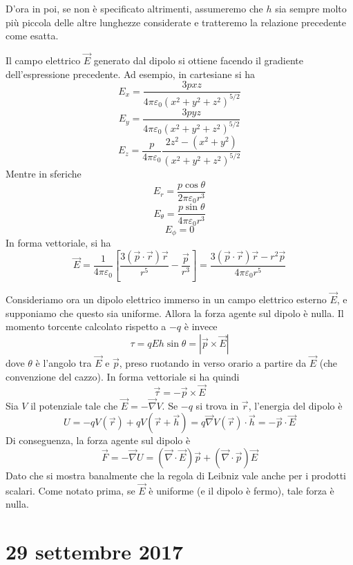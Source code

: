 \documentclass[a4paper,11pt]{book}
\let\oldnabla\nabla
\renewcommand{\nabla}{\vec{\oldnabla}}
\let\oldepsilon\epsilon
\let\oldvarepsilon\varepsilon
\renewcommand{\epsilon}{\oldvarepsilon}
\renewcommand{\varepsilon}{\oldepsilon}
\theoremstyle{definition}
\theoremstyle{theorem}
\begin{document}
	D'ora in poi, se non è specificato altrimenti, assumeremo che $h$ sia sempre molto più piccola delle altre lunghezze considerate e tratteremo la relazione precedente come  esatta.
	
	Il campo elettrico $\vec{E}$ generato dal dipolo si ottiene facendo il gradiente dell'espressione precedente. Ad esempio, in cartesiane si ha
	\[E_x=\frac{3pxz}{4\pi\epsilon_0\left(x^2+y^2+z^2\right)^{5/2}}\]
	\[E_y=\frac{3pyz}{4\pi\epsilon_0\left(x^2+y^2+z^2\right)^{5/2}}\]
	\[E_z=\frac{p}{4\pi\epsilon_0}\frac{2z^2-(x^2+y^2)}{\left(x^2+y^2+z^2\right)^{5/2}}\]
	Mentre in sferiche
	\[E_r=\frac{p\cos\theta}{2\pi\epsilon_0r^3}\]
	\[E_{\theta}=\frac{p\sin\theta}{4\pi\epsilon_0r^3}\]
	\[E_{\phi}=0\]
	In forma vettoriale, si ha
	\[\vec{E}=\frac{1}{4\pi\epsilon_0}\left[\frac{3\left(\vec p\cdot\vec{r}\right)\vec{r}}{r^5}-\frac{\vec{p}}{r^3}\right]=\frac{3\left(\vec p\cdot\vec{r}\right)\vec{r}-r^2\vec{p}}{4\pi\epsilon_0r^5}\]
	
	Consideriamo ora un dipolo elettrico immerso in un campo elettrico esterno $\vec{E}$, e supponiamo che questo sia uniforme. Allora la forza agente sul dipolo è nulla. Il momento torcente calcolato rispetto a $-q$ è invece
	\[\tau=qEh\sin\theta=|\vec p\times\vec{E}|\]
	dove $\theta$ è l'angolo tra $\vec{E}$ e $\vec{p}$, preso ruotando in verso orario a partire da $\vec{E}$ (che convenzione del cazzo). In forma vettoriale si ha quindi
	\[\vec{\tau}=-\vec{p}\times\vec{E}\]
	Sia $V$ il potenziale tale che $\vec{E}=-\nabla V$. Se $-q$ si trova in $\vec{r}$, l'energia del dipolo è
	\[U=-qV(\vec{r})+qV(\vec{r}+\vec{h})=q\nabla V(\vec{r})\cdot\vec{h}=-\vec{p}\cdot\vec{E}\]
	Di conseguenza, la forza agente sul dipolo è
	\[\vec{F}=-\nabla U=\left(\nabla\cdot\vec{E}\right)\vec{p}+\left(\nabla\cdot\vec{p}\right)\vec{E}\]
	Dato che si mostra banalmente che la regola di Leibniz vale anche per i prodotti scalari. Come notato prima, se $\vec E$ è uniforme (e il dipolo è fermo), tale forza è nulla.
	\section{29 settembre 2017}
\end{document}
